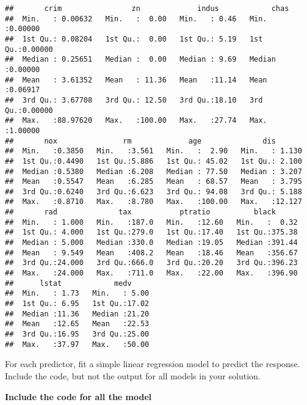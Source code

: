 \documentclass[]{article}
\begin{document}
\begin{verbatim}
##       crim                zn             indus            chas        
##  Min.   : 0.00632   Min.   :  0.00   Min.   : 0.46   Min.   :0.00000  
##  1st Qu.: 0.08204   1st Qu.:  0.00   1st Qu.: 5.19   1st Qu.:0.00000  
##  Median : 0.25651   Median :  0.00   Median : 9.69   Median :0.00000  
##  Mean   : 3.61352   Mean   : 11.36   Mean   :11.14   Mean   :0.06917  
##  3rd Qu.: 3.67708   3rd Qu.: 12.50   3rd Qu.:18.10   3rd Qu.:0.00000  
##  Max.   :88.97620   Max.   :100.00   Max.   :27.74   Max.   :1.00000  
##       nox               rm             age              dis        
##  Min.   :0.3850   Min.   :3.561   Min.   :  2.90   Min.   : 1.130  
##  1st Qu.:0.4490   1st Qu.:5.886   1st Qu.: 45.02   1st Qu.: 2.100  
##  Median :0.5380   Median :6.208   Median : 77.50   Median : 3.207  
##  Mean   :0.5547   Mean   :6.285   Mean   : 68.57   Mean   : 3.795  
##  3rd Qu.:0.6240   3rd Qu.:6.623   3rd Qu.: 94.08   3rd Qu.: 5.188  
##  Max.   :0.8710   Max.   :8.780   Max.   :100.00   Max.   :12.127  
##       rad              tax           ptratio          black       
##  Min.   : 1.000   Min.   :187.0   Min.   :12.60   Min.   :  0.32  
##  1st Qu.: 4.000   1st Qu.:279.0   1st Qu.:17.40   1st Qu.:375.38  
##  Median : 5.000   Median :330.0   Median :19.05   Median :391.44  
##  Mean   : 9.549   Mean   :408.2   Mean   :18.46   Mean   :356.67  
##  3rd Qu.:24.000   3rd Qu.:666.0   3rd Qu.:20.20   3rd Qu.:396.23  
##  Max.   :24.000   Max.   :711.0   Max.   :22.00   Max.   :396.90  
##      lstat            medv      
##  Min.   : 1.73   Min.   : 5.00  
##  1st Qu.: 6.95   1st Qu.:17.02  
##  Median :11.36   Median :21.20  
##  Mean   :12.65   Mean   :22.53  
##  3rd Qu.:16.95   3rd Qu.:25.00  
##  Max.   :37.97   Max.   :50.00
\end{verbatim}

For each predictor, fit a simple linear regression model to predict the
response. Include the code, but not the output for all models in your
solution.

\textbf{Include the code for all the model}
\end{document}
